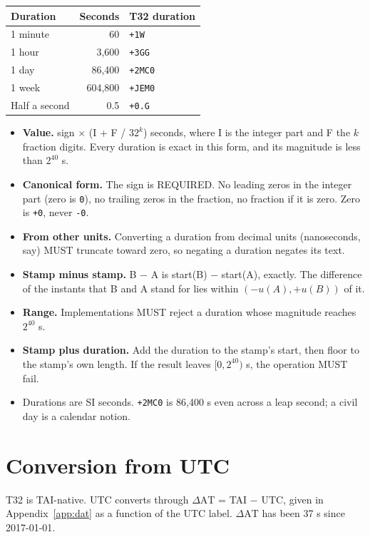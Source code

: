 \documentclass[11pt]{article}
\newcommand{\lit}[1]{\texttt{#1}}
\newcommand{\dAT}{\ensuremath{\Delta\mathrm{AT}}}
\newcommand{\pow}[2]{\ensuremath{#1^{#2}}}
\newcommand{\App}[1]{Appendix~\ref{#1}}
\begin{document}
\begin{center}
\begin{tabular}{@{}lrl@{}}
\toprule
Duration & Seconds & T32 duration \\
\midrule
1 minute & 60 & \lit{+1W} \\
1 hour & 3,600 & \lit{+3GG} \\
1 day & 86,400 & \lit{+2MC0} \\
1 week & 604,800 & \lit{+JEM0} \\
Half a second & 0.5 & \lit{+0.G} \\
\bottomrule
\end{tabular}
\end{center}

\begin{itemize}
\item \textbf{Value.} sign $\times$ (I + F / $32^k$) seconds, where I is the
integer part and F the $k$ fraction digits. Every duration is exact in this
form, and its magnitude is less than \pow{2}{40} s.
\item \textbf{Canonical form.} The sign is REQUIRED. No leading zeros in the
integer part (zero is \lit{0}), no trailing zeros in the fraction, no fraction
if it is zero. Zero is \lit{+0}, never \lit{-0}.
\item \textbf{From other units.} Converting a duration from decimal units
(nanoseconds, say) MUST truncate toward zero, so negating a duration negates
its text.
\item \textbf{Stamp minus stamp.} B $-$ A is start(B) $-$ start(A), exactly.
The difference of the instants that B and A stand for lies within
$(-u(A), +u(B))$ of it.
\item \textbf{Range.} Implementations MUST reject a duration whose magnitude
reaches \pow{2}{40} s.
\item \textbf{Stamp plus duration.} Add the duration to the stamp's start,
then floor to the stamp's own length. If the result leaves $[0, 2^{40})$ s,
the operation MUST fail.
\item Durations are SI seconds. \lit{+2MC0} is 86,400 s even across a leap
second; a civil day is a calendar notion.
\end{itemize}

\section{Conversion from UTC}\label{sec:utc}

T32 is TAI-native. UTC converts through \dAT{} = TAI $-$ UTC, given in
\App{app:dat} as a function of the UTC label. \dAT{} has been 37 s since
2017-01-01.
\end{document}
